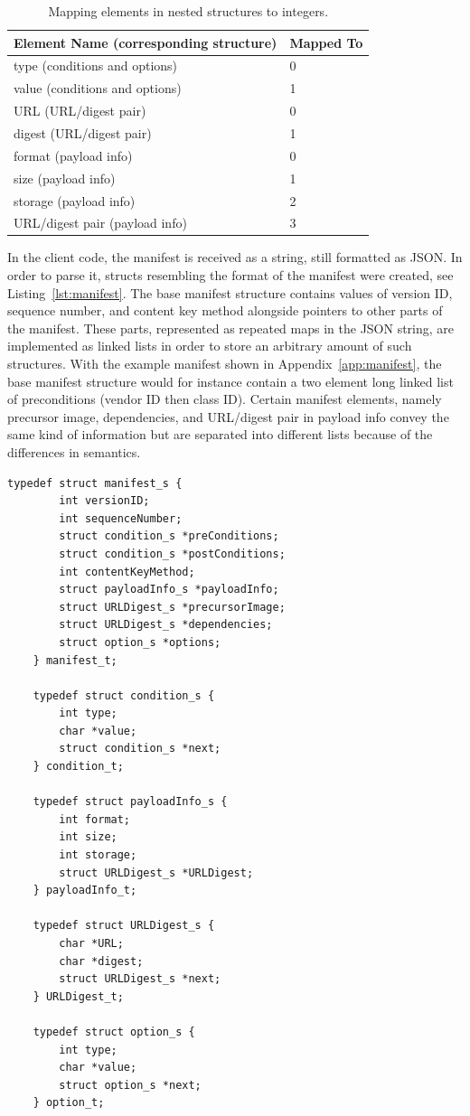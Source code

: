 \documentclass[0-thesis.tex]{subfiles}
\begin{document}
\begin{longtable}[]{@{}ll@{}}
    \caption{Mapping elements in nested structures to integers.}
    \label{tab:nested-substitution}\\
    \toprule
    Element Name (corresponding structure) & Mapped To\tabularnewline
    \midrule
    \endhead
    type (conditions and options) & 0\tabularnewline
    value (conditions and options) & 1\tabularnewline
    \bottomrule
    URL (URL/digest pair) & 0\tabularnewline
    digest (URL/digest pair) & 1\tabularnewline
    \bottomrule
    format (payload info) & 0\tabularnewline
    size (payload info) & 1\tabularnewline
    storage (payload info) & 2\tabularnewline
    URL/digest pair (payload info) & 3\tabularnewline
    \bottomrule
\end{longtable}

In the client code, the manifest is received as a string, still formatted as JSON. In
order to parse it, structs resembling the format of the manifest were created, see
Listing~\ref{lst:manifest}. The base manifest structure contains values of version ID,
sequence number, and content key method alongside pointers to other parts of the manifest.
These parts, represented as repeated maps in the JSON string, are implemented as linked
lists in order to store an arbitrary amount of such structures. With the example manifest
shown in Appendix~\ref{app:manifest}, the base manifest structure would for instance
contain a two element long linked list of preconditions (vendor ID then class ID). Certain
manifest elements, namely precursor image, dependencies, and URL/digest pair in payload
info convey the same kind of information but are separated into different lists because of
the differences in semantics.

\begin{lstlisting}[language=manifest, caption={The client manifest implementation}, label=lst:manifest]
    typedef struct manifest_s {
        int versionID;
        int sequenceNumber;
        struct condition_s *preConditions;
        struct condition_s *postConditions;
        int contentKeyMethod;
        struct payloadInfo_s *payloadInfo;
        struct URLDigest_s *precursorImage;
        struct URLDigest_s *dependencies;
        struct option_s *options;
    } manifest_t;

    typedef struct condition_s {
        int type;
        char *value;
        struct condition_s *next;
    } condition_t;

    typedef struct payloadInfo_s {
        int format;
        int size;
        int storage;
        struct URLDigest_s *URLDigest;
    } payloadInfo_t;

    typedef struct URLDigest_s {
        char *URL;
        char *digest;
        struct URLDigest_s *next;
    } URLDigest_t;

    typedef struct option_s {
        int type;
        char *value;
        struct option_s *next;
    } option_t;
\end{lstlisting}
\end{document}

